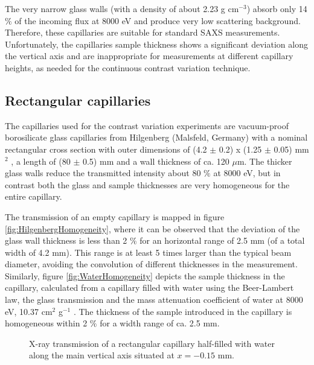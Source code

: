 The very narrow glass walls (with a density of about 2.23 g cm$^{-3}$) absorb only 14 $\%$ of the incoming flux at 8000 eV and produce very low scattering background. Therefore, these capillaries are suitable for standard SAXS measurements. Unfortunately, the capillaries sample thickness shows a significant deviation along the vertical axis and are inappropriate for measurements at different capillary heights, as needed for the continuous contrast variation technique.

\subsection{Rectangular capillaries}

The capillaries used for the contrast variation experiments are vacuum-proof borosilicate glass capillaries from Hilgenberg (Malsfeld, Germany) with a nominal rectangular cross section with outer dimensions of (4.2 $\pm$ 0.2) x (1.25 $\pm$ 0.05) mm$^2$ , a length of (80 $\pm$ 0.5) mm and a wall thickness of ca. 120 $\mu$m. The thicker glass walls reduce the transmitted intensity about 80 $\%$ at 8000 eV, but in contrast both the glass and sample thicknesses are very homogeneous for the entire capillary.

The transmission of an empty capillary is mapped in figure \ref{fig:HilgenbergHomogeneity}, where it can be observed that the deviation of the glass wall thickness is less than 2 $\%$ for an horizontal range of 2.5 mm (of a total width of 4.2 mm). This range is at least 5 times larger than the typical beam diameter, avoiding the convolution of different thicknesses in the measurement. Similarly, figure \ref{fig:WaterHomogeneity} depicts the sample thickness in the capillary, calculated from a capillary filled with water using the Beer-Lambert law, the glass transmission and the mass attenuation coefficient of water at 8000 eV, 10.37 cm$^{2}$ g$^{-1}$ \citep{hubbell_tables_1996}. The thickness of the sample introduced in the capillary is homogeneous within 2 $\%$ for a width range of ca. 2.5 mm. 

\begin{figure}%
	\centering
	
	
		
		\caption[X-ray transmission of a rectangular capillary half-filled with water.]{X-ray transmission of a rectangular capillary half-filled with water along the main vertical axis situated at $x=-0.15$ mm.}
		\label{fig:GaldenCalibration}
\end{figure}

